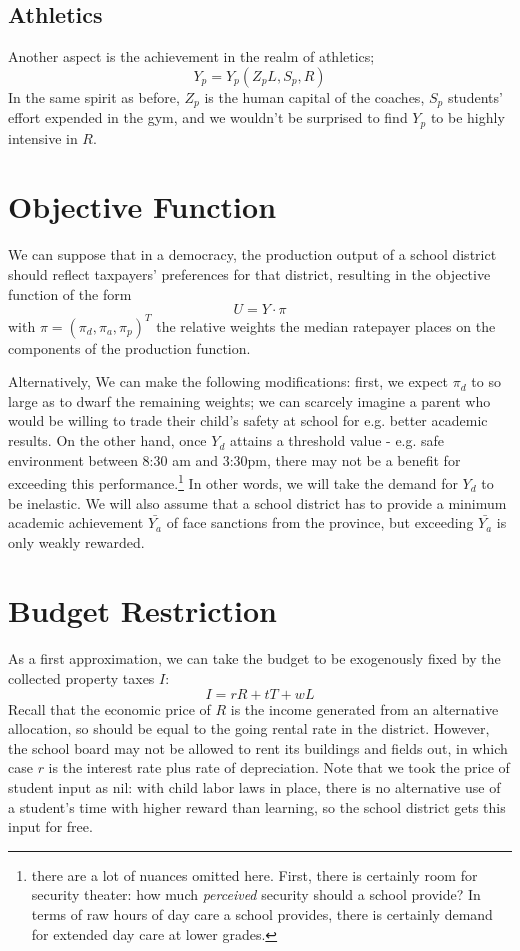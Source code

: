 \documentclass{homework}
\begin{document}
\subsection{Athletics} Another aspect is the achievement in the realm of athletics; \[ Y_p = Y_p(Z_pL,S_p,R)\]
In the same spirit as before, $Z_p$ is the human capital of the coaches, $S_p$ students' effort expended in the gym, and we wouldn't be surprised to find $Y_p$ to be highly intensive in $R$.

\section{Objective Function}
We can suppose that in a democracy, the production output of a school district should reflect taxpayers' preferences for that district, resulting in the objective function of the form \[ U = Y\cdot \pi\]
with $\pi = (\pi_d, \pi_a, \pi_p)^T$ the relative weights the median ratepayer\cite{lawton} places on the components of the production function. 

Alternatively, We can make the following modifications: first, we expect $\pi_d$ to so large as to dwarf the remaining weights; we can scarcely imagine a parent who would be willing to trade their child's safety at school for e.g. better academic results. On the other hand, once $Y_d$ attains a threshold value - e.g. safe environment between 8:30 am and 3:30pm, there may not be a benefit for exceeding this performance.\footnote{there are a lot of nuances omitted here. First, there is certainly room for security theater: how much \emph{perceived} security should a school provide? In terms of raw hours of day care a school provides, there is certainly demand for extended day care at lower grades.}
In other words, we will take the demand for $Y_d$ to be inelastic. We will also assume that a school district has to provide a minimum academic achievement $\bar{Y_a}$ of face sanctions from the province, but exceeding $\bar{Y_a}$ is only weakly rewarded.

\section{Budget Restriction}
As a first approximation, we can take the budget to be exogenously fixed by the collected property taxes $I$:
\[I = rR + tT + wL\]
Recall that the economic price of $R$ is the income generated from an alternative allocation, so should be equal to the going rental rate in the district. However, the school board may not be allowed to rent its buildings and fields out, in which case $r$ is the interest rate plus rate of depreciation. Note that we took the price of student input as nil: with child labor laws in place, there is no alternative use of a student's time with higher reward than learning, so the school district gets this input for free. 
\end{document}
